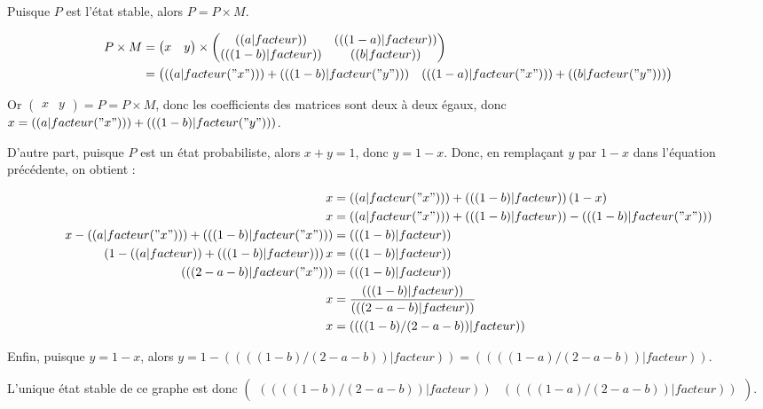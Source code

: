 \exercice*
Puisque $P$ est l'état stable, alors $P=P\times M$.

\begin{align*}
    P\times M &= \begin{pmatrix}x&y\end{pmatrix}\times
\begin{pmatrix}
  (( a|facteur )) & (( (1-a)|facteur )) \\
  (( (1-b)|facteur )) & (( b|facteur )) \\
\end{pmatrix}\\
&= \begin{pmatrix}
  (( a|facteur("x") )) + (( (1-b)|facteur("y") )) & (( (1-a)|facteur("x") )) + (( b|facteur("y") ))
\end{pmatrix}
\end{align*}

Or $\begin{pmatrix}x&y\end{pmatrix}=P=P\times M$, donc les coefficients des matrices sont deux à deux égaux, donc $x=(( a|facteur("x") )) + (( (1-b)|facteur("y") ))$.

D'autre part, puisque $P$ est un état probabiliste, alors $x+y=1$, donc $y=1-x$. Donc, en remplaçant $y$ par $1-x$ dans l'équation précédente, on obtient :

\begin{align*}
  x &= (( a|facteur("x") )) + (( (1-b)|facteur ))\,(1-x) \\
  x &= (( a|facteur("x") )) + (( (1-b)|facteur )) - (( (1-b)|facteur("x") ))\\
  x-(( a|facteur("x") )) +(( (1-b)|facteur("x") )) &= (( (1-b)|facteur ))\\
  (1-(( a|facteur ))+(( (1-b)|facteur ))) \,x &= (( (1-b)|facteur ))\\
  (( (2-a-b)|facteur("x") )) &= (( (1-b)|facteur ))\\
  x &= \frac{(( (1-b)|facteur ))}{(( (2-a-b)|facteur ))}\\
x &= (( ((1-b)/(2-a-b))|facteur ))
\end{align*}

Enfin, puisque $y=1-x$, alors $y=1-(( ((1-b)/(2-a-b))|facteur ))=(( ((1-a)/(2-a-b))|facteur ))$.

L'unique état stable de ce graphe est donc $\begin{pmatrix}
(( ((1-b)/(2-a-b))|facteur )) &
(( ((1-a)/(2-a-b))|facteur ))
\end{pmatrix}$.
